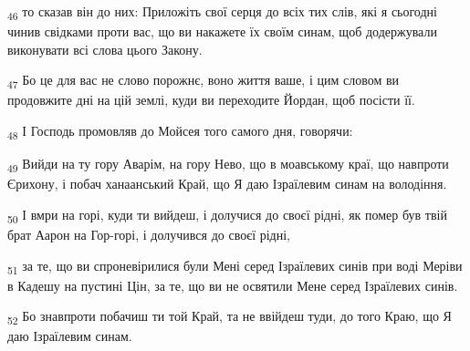 \begin{tcolorbox}
\textsubscript{46} то сказав він до них: Приложіть свої серця до всіх тих слів, які я сьогодні чинив свідками проти вас, що ви накажете їх своїм синам, щоб додержували виконувати всі слова цього Закону.
\end{tcolorbox}
\begin{tcolorbox}
\textsubscript{47} Бо це для вас не слово порожнє, воно життя ваше, і цим словом ви продовжите дні на цій землі, куди ви переходите Йордан, щоб посісти її.
\end{tcolorbox}
\begin{tcolorbox}
\textsubscript{48} І Господь промовляв до Мойсея того самого дня, говорячи:
\end{tcolorbox}
\begin{tcolorbox}
\textsubscript{49} Вийди на ту гору Аварім, на гору Нево, що в моавському краї, що навпроти Єрихону, і побач ханаанський Край, що Я даю Ізраїлевим синам на володіння.
\end{tcolorbox}
\begin{tcolorbox}
\textsubscript{50} І вмри на горі, куди ти вийдеш, і долучися до своєї рідні, як помер був твій брат Аарон на Гор-горі, і долучився до своєї рідні,
\end{tcolorbox}
\begin{tcolorbox}
\textsubscript{51} за те, що ви спроневірилися були Мені серед Ізраїлевих синів при воді Меріви в Кадешу на пустині Цін, за те, що ви не освятили Мене серед Ізраїлевих синів.
\end{tcolorbox}
\begin{tcolorbox}
\textsubscript{52} Бо знавпроти побачиш ти той Край, та не ввійдеш туди, до того Краю, що Я даю Ізраїлевим синам.
\end{tcolorbox}
